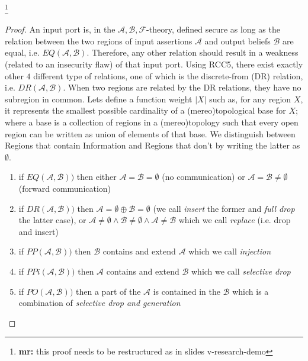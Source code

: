 \documentclass[conference]{IEEEtran}
\newcommand{\fixnote}[2]{\textbf{\color{red}{FIX}}\footnote{{\bf #1:} #2}}
\newcommand{\assertionRegion}{\mathcal{A}}
\newcommand{\beliefRegion}{\mathcal{B}}
\newcommand{\factRegion}{\mathcal{F}}
\newcommand{\abf}{\assertionRegion,\beliefRegion,\factRegion}
\newcommand{\eq}[2]{EQ(#1,#2)}
\newcommand{\pp}[2]{PP(#1,#2)}
\newcommand{\po}[2]{PO(#1,#2)}
\newcommand{\ppi}[2]{PPi(#1,#2)}
\newcommand{\dr}[2]{DR(#1,#2)}
\begin{document}
\fixnote{mr}{this proof needs to be restructured as in slides v-research-demo}
\begin{proof}
An input port is, in the $\abf$-theory, defined secure as long as the relation
	between the two regions of input assertions $\assertionRegion$ and
	output beliefs $\beliefRegion$ are equal, i.e.
	$\eq{\assertionRegion}{\beliefRegion}$. Therefore, any other relation
	should result in a weakness (related to an insecurity flaw) of that
	input port.  Using RCC5, there exist exactly other $4$ different type
	of relations, one of which is the discrete-from (DR) relation, i.e.
	$\dr{\assertionRegion}{\beliefRegion}$. When two regions are related by
	the DR relations, they have no subregion in common. Lets
	define a function weight $|X|$ such as, for any region $X$, it
	represents the smallest possible cardinality of a (mereo)topological base for
	$X$; where a base is a collection of regions in a (mereo)topology such that
	every open region can be written as union of elements of that base. 
	We distinguish between Regions that contain Information and Regions that
	don't by writing the latter as $\emptyset$.
	\begin{enumerate}
		\item if $\eq{\assertionRegion}{\beliefRegion})$ then either
			$\assertionRegion=\beliefRegion=\emptyset$ (no
			communication) or
			$\assertionRegion=\beliefRegion\neq\emptyset$ (forward
			communication)
		\item if $\dr{\assertionRegion}{\beliefRegion})$ then
			$\assertionRegion=\emptyset\oplus\beliefRegion=\emptyset$
			(we call \emph{insert} the former and \emph{full drop}
			the latter case), or
			$\assertionRegion\neq\emptyset\wedge\beliefRegion\neq\emptyset\wedge\assertionRegion\neq\beliefRegion$
			which we call \emph{replace} (i.e. drop and insert)
		\item if $\pp{\assertionRegion}{\beliefRegion})$ then
			$\beliefRegion$ contains and extend $\assertionRegion$
			which we call \emph{injection}
		\item if $\ppi{\assertionRegion}{\beliefRegion})$ then
			$\assertionRegion$ contains and extend $\beliefRegion$
			which we call \emph{selective drop}
		\item if $\po{\assertionRegion}{\beliefRegion})$ then a part of
			the $\assertionRegion$ is contained in the
			$\beliefRegion$ which is a combination of
			\emph{selective drop and generation}
	\end{enumerate}
\end{proof}
\end{document}
